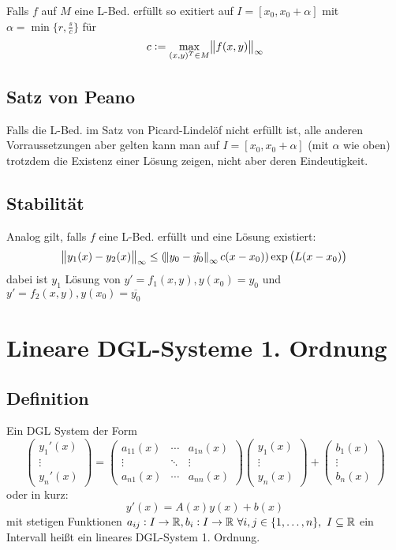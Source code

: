 Falls $f$ auf $M$ eine L-Bed. erfüllt so exitiert auf $I = [x_0, x_0 + \alpha]$ mit $\alpha = \min \{r, \frac{s}{c} \}$
für
\begin{equation*}
	c := \max_{(x,y)^T \in M} \norm{f(x,y)}_\infty
\end{equation*}

\subsection{Satz von Peano}
Falls die L-Bed. im Satz von Picard-Lindelöf nicht erfüllt ist, alle anderen Vorraussetzungen aber gelten kann man auf
$I = [x_0, x_0 + \alpha]$ (mit $\alpha$ wie oben) trotzdem die Existenz einer Lösung zeigen, nicht aber deren Eindeutigkeit.

\subsection{Stabilität}
Analog gilt, falls $f$ eine L-Bed. erfüllt und eine Lösung existiert:
\begin{equation*}
	\norm{y_1(x) - y_2(x)}_\infty \leq (\norm{y_0 - \tilde{y_0}}_\infty c (x-x_0)) \exp{\left(L(x-x_0)\right)}
\end{equation*}
dabei ist $y_1$ Lösung von $y'=f_1(x,y), y(x_0)=y_0$ und $y'=f_2(x,y), y(x_0) = \overline{y_0}$

\section{Lineare DGL-Systeme 1. Ordnung}
\subsection{Definition}
Ein DGL System der Form
\begin{equation*}
	\begin{pmatrix}
		y_1'(x) \\ \vdots \\ y_n'(x)
	\end{pmatrix} = 
	\begin{pmatrix}
		a_{11}(x) & \cdots & a_{1n}(x) \\
		\vdots & \ddots & \vdots \\
		a_{n1}(x) & \cdots & a_{nn}(x)
	\end{pmatrix}
	\begin{pmatrix}
		y_1(x) \\ \vdots \\ y_n(x)
	\end{pmatrix} +
	\begin{pmatrix}
		b_1(x) \\ \vdots \\ b_n(x)
	\end{pmatrix}
\end{equation*}
oder in kurz:
\begin{equation*}
	y'(x) = A(x) y(x) + b(x)
\end{equation*}
mit stetigen Funktionen $a_{ij}: I \to \mathbb{R}, b_i:I \to \mathbb{R}\ \forall i,j \in \{1, \ldots, n\},\ I \subseteq \mathbb{R}$ ein Intervall heißt ein lineares DGL-System 1. Ordnung.

